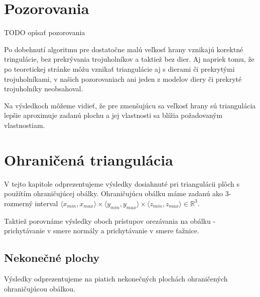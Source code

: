 \begin{enumerate}
{}
     

\end{enumerate}

\newpage
\section{Pozorovania}
TODO opísať pozorovania

Po dobehnutí algoritmu pre dostatočne malú veľkosť hrany vznikajú korektné tringulácie,
bez prekrývania trojuholníkov a taktiež bez dier. Aj napriek tomu, že po teoretickej stránke
môžu vznikať triangulácie aj s dierami či prekrytými trojuholníkami, 
v našich pozorovaniach ani jeden z modelov diery či prekryté trojuholníky neobsahoval.

Na výsledkoch môžeme vidieť, že pre zmenšujúcu sa veľkosť hrany sú triangulácia lepšie 
aproximuje zadanú plochu a jej vlastnosti sa blížia požadovaným vlastnostiam.

\section{Ohraničená triangulácia}

V tejto kapitole odprezentujeme výsledky dosiahnuté pri triangulácii plôch s použítím 
ohraničujúcej obálky. Ohraničujúcu obálku máme zadanú ako $3$-rozmerný interval 
$\langle x_{min}, x_{max}\rangle
\times \langle y_{min}, y_{max}\rangle \times \langle z_{min}, z_{max}\rangle \in \mathbb{R}^3.$ 

Taktiež porovnáme výsledky oboch prístupov orezávania na obálku - prichytávanie v smere normály
a prichytávanie v smere ťažnice.

\subsection{Nekonečné plochy}

Výsledky odprezentujeme na piatich nekonečných plochách ohraničených ohraničujúcou obálkou.

